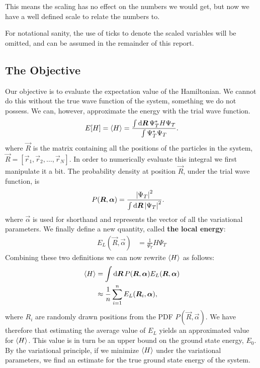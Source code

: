 \documentclass[twocolumn]{article}
\begin{document}
This means the scaling has no effect on the numbers we would get, but now we
have a well defined scale to relate the numbers to.

For notational sanity, the use of ticks to denote the scaled variables will be
omitted, and can be assumed in the remainder of this report. 



\subsection{The Objective}
Our objective is to evaluate the expectation value of the Hamiltonian. We cannot do this
without the true wave function of the system, something we do not possess.
We can, however, approximate the energy with the trial wave function.
\begin{align}
    E[H] = \expval{H} = \frac{\int \dd{\bm R} \Psi^*_T H \Psi_T}{\int
    \Psi_T^*\Psi_T}.
\end{align}
where $\vec R$ is the matrix containing all the positions of the particles in
the system, $\vec R = [\vec r_1, \vec r_2, \dots, \vec r_N]$.
In order to numerically evaluate this integral we first manipulate it a bit.
The probability density at position $\vec R$, under the trial wave function, is
\begin{align}
    P(\bm R, \bm \alpha) &= \frac{\abs{\Psi_T}^2}{\int \dd{\bm R}\abs{\Psi_T}^2}.
\end{align}
where $\vec \alpha$ is used for shorthand and represents the vector of all the variational parameters.
We finally define a new quantity, called \textbf{the local energy}:
\begin{align}
    E_L(\vec R, \vec \alpha) &= \frac{1}{\Psi_T}H\Psi_T\label{eq:E_L}
\end{align}
Combining these two definitions we can now rewrite $\expval{H}$ as follows:
\begin{align}
    \begin{split}
        \expval{H} &= \int \dd{\bm R} P(\bm R,\bm\alpha) E_L(\bm R,\bm\alpha)\\
        &\approx
        \frac{1}{n}\sum_{i=1}^n E_L(\bm R_i,\bm\alpha),
    \end{split}\label{eq:the-objective}
\end{align}
where $R_i$ are randomly drawn positions from the PDF $P(\vec R, \vec\alpha)$.
We have therefore that estimating the average value of $E_L$ yields an
approximated value for $\expval{H}$. This value is in turn be an upper bound on the
ground state energy, $E_0$. By the variational principle, if we minimize
$\expval{H}$ under the variational parameters, we find an estimate for the true
ground state energy of the system.
\end{document}
